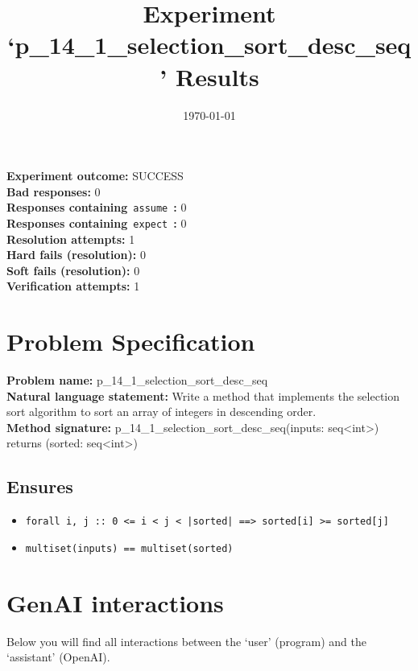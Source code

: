 \documentclass{article}
\begin{document}
\title{Experiment `p\_14\_1\_selection\_sort\_desc\_seq' Results}
\author{\today}
\date{}
\maketitle
\textbf{Experiment outcome: }SUCCESS
\\\textbf{Bad responses: }0
\\\textbf{Responses containing}~\texttt{assume}~\textbf{: }0
\\\textbf{Responses containing}~\texttt{expect}~\textbf{: }0
\\\textbf{Resolution attempts: }1
\\\textbf{Hard fails (resolution): }0
\\\textbf{Soft fails (resolution): }0
\\\textbf{Verification attempts: }1
\section*{Problem Specification}
\textbf{Problem name: }p\_14\_1\_selection\_sort\_desc\_seq
\\\textbf{Natural language statement: }Write a method that implements the selection sort algorithm to sort an array of integers in descending order.
\\\textbf{Method signature: }p\_14\_1\_selection\_sort\_desc\_seq(inputs: seq<int>) returns (sorted: seq<int>)
\subsection*{Ensures}
\begin{itemize}
\item \texttt{forall i, j :: 0 <= i < j < |sorted| ==> sorted[i] >= sorted[j]}
\item \texttt{multiset(inputs) == multiset(sorted)}
\end{itemize}
\clearpage
\section*{GenAI interactions}
Below you will find all interactions between the `user' (program) and the `assistant' (OpenAI).
\end{document}
